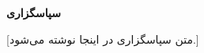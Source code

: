 \begin{acknowledgementpage}

\vspace{1.5cm}

\textbf{سپاسگزاری}

\vspace{1cm}

[متن سپاسگزاری در اینجا نوشته می‌شود.]

\end{acknowledgementpage}
\newpage
